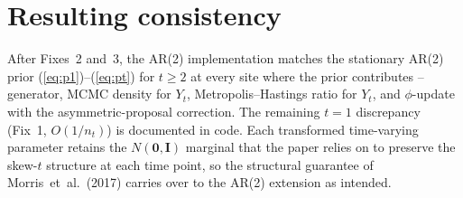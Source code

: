 \documentclass[11pt]{article}
\newcommand{\bI}{\mathbf{I}}
\newcommand{\bZero}{\boldsymbol{0}}
\newcommand{\skewt}{skew-$t$\xspace}
\newcommand{\eref}[1]{(\ref{#1})}
\begin{document}
\section{Resulting consistency}\label{ar2fix:summary}

After Fixes~2 and~3, the AR(2) implementation matches the stationary AR(2)
prior \eref{eq:p1}--\eref{eq:pt} for $t \geq 2$ at every site where the
prior contributes -- generator, MCMC density for $Y_t$, Metropolis--Hastings
ratio for $Y_t$, and $\phi$-update with the asymmetric-proposal correction.
The remaining $t = 1$ discrepancy (Fix~1, $O(1/n_t)$) is documented in code.
Each transformed time-varying parameter retains the $N(\bZero, \bI)$ marginal
that the paper relies on to preserve the \skewt structure at each time
point, so the structural guarantee of Morris~et~al.\ (2017) carries over to
the AR(2) extension as intended.
\end{document}

